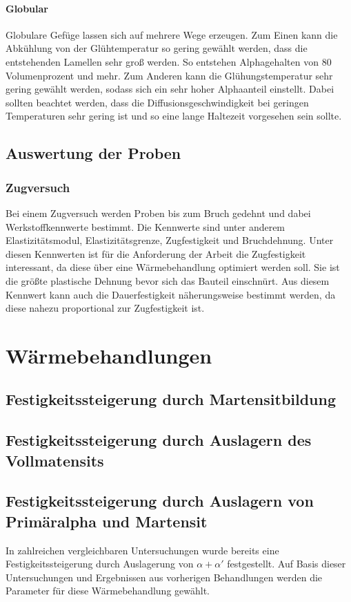 \documentclass[a4paper, 11pt]{tubsreprt}
\begin{document}
\subsubsection{Globular}
Globulare Gefüge lassen sich auf mehrere Wege erzeugen. Zum Einen kann die Abkühlung von der Glühtemperatur so gering gewählt werden, dass die entstehenden Lamellen sehr groß werden. So entstehen Alphagehalten von 80 Volumenprozent und mehr. Zum Anderen kann die Glühungstemperatur sehr gering gewählt werden, sodass sich ein sehr hoher Alphaanteil einstellt. Dabei sollten beachtet werden, dass die Diffusionsgeschwindigkeit bei geringen Temperaturen sehr gering ist und so eine lange Haltezeit vorgesehen sein sollte. 

\section{Auswertung der Proben}
\subsection{Zugversuch}
Bei einem Zugversuch werden Proben bis zum Bruch gedehnt und dabei Werkstoffkennwerte bestimmt. Die Kennwerte sind unter anderem  Elastizitätsmodul, Elastizitätsgrenze, Zugfestigkeit und Bruchdehnung. Unter diesen Kennwerten ist für die Anforderung der Arbeit die Zugfestigkeit interessant, da diese über eine Wärmebehandlung optimiert werden soll. Sie ist die größte plastische Dehnung bevor sich das Bauteil einschnürt. Aus diesem Kennwert kann auch die Dauerfestigkeit näherungsweise bestimmt werden, da diese nahezu proportional zur Zugfestigkeit ist. 

\chapter{Wärmebehandlungen}
\section{Festigkeitssteigerung durch Martensitbildung}
\section{Festigkeitssteigerung durch Auslagern des Vollmatensits}
\section{Festigkeitssteigerung durch Auslagern von Primäralpha und Martensit}
In zahlreichen vergleichbaren Untersuchungen wurde bereits eine Festigkeitssteigerung durch Auslagerung von $\alpha + \alpha'$ festgestellt. Auf Basis dieser Untersuchungen und Ergebnissen aus vorherigen Behandlungen werden die Parameter für diese Wärmebehandlung gewählt. 
\end{document}

